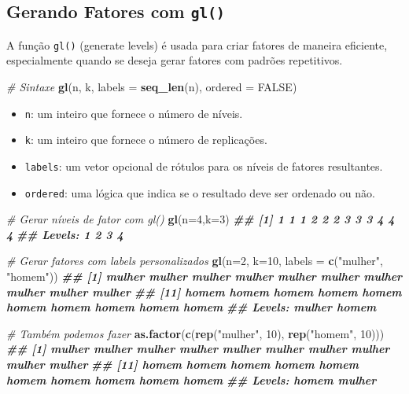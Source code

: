\documentclass[
]{book}
\newenvironment{Shaded}{\begin{snugshade}}{\end{snugshade}}
\newcommand{\AttributeTok}[1]{\textcolor[rgb]{0.13,0.29,0.53}{#1}}
\newcommand{\CommentTok}[1]{\textcolor[rgb]{0.56,0.35,0.01}{\textit{#1}}}
\newcommand{\ConstantTok}[1]{\textcolor[rgb]{0.56,0.35,0.01}{#1}}
\newcommand{\DecValTok}[1]{\textcolor[rgb]{0.00,0.00,0.81}{#1}}
\newcommand{\DocumentationTok}[1]{\textcolor[rgb]{0.56,0.35,0.01}{\textbf{\textit{#1}}}}
\newcommand{\FunctionTok}[1]{\textcolor[rgb]{0.13,0.29,0.53}{\textbf{#1}}}
\newcommand{\NormalTok}[1]{#1}
\newcommand{\StringTok}[1]{\textcolor[rgb]{0.31,0.60,0.02}{#1}}
\begin{document}
\subsection{\texorpdfstring{Gerando Fatores com \texttt{gl()}}{Gerando Fatores com gl()}}\label{gerando-fatores-com-gl}

A função \texttt{gl()} (generate levels) é usada para criar fatores de maneira
eficiente, especialmente quando se deseja gerar fatores com padrões
repetitivos.

\begin{Shaded}
\begin{Highlighting}[]
\CommentTok{\# Sintaxe}
\FunctionTok{gl}\NormalTok{(n, k, }\AttributeTok{labels =} \FunctionTok{seq\_len}\NormalTok{(n), }\AttributeTok{ordered =} \ConstantTok{FALSE}\NormalTok{)}
\end{Highlighting}
\end{Shaded}

\begin{itemize}
\item
  \texttt{n}: um inteiro que fornece o número de níveis.
\item
  \texttt{k}: um inteiro que fornece o número de replicações.
\item
  \texttt{labels}: um vetor opcional de rótulos para os níveis de fatores
  resultantes.
\item
  \texttt{ordered}: uma lógica que indica se o resultado deve ser ordenado ou
  não.
\end{itemize}

\begin{Shaded}
\begin{Highlighting}[]
\CommentTok{\# Gerar níveis de fator com gl()}
\FunctionTok{gl}\NormalTok{(}\AttributeTok{n=}\DecValTok{4}\NormalTok{,}\AttributeTok{k=}\DecValTok{3}\NormalTok{)}
\DocumentationTok{\#\#  [1] 1 1 1 2 2 2 3 3 3 4 4 4}
\DocumentationTok{\#\# Levels: 1 2 3 4}

\CommentTok{\# Gerar fatores com labels personalizados}
\FunctionTok{gl}\NormalTok{(}\AttributeTok{n=}\DecValTok{2}\NormalTok{, }\AttributeTok{k=}\DecValTok{10}\NormalTok{, }\AttributeTok{labels =} \FunctionTok{c}\NormalTok{(}\StringTok{"mulher"}\NormalTok{, }\StringTok{"homem"}\NormalTok{))}
\DocumentationTok{\#\#  [1] mulher mulher mulher mulher mulher mulher mulher mulher mulher mulher}
\DocumentationTok{\#\# [11] homem  homem  homem  homem  homem  homem  homem  homem  homem  homem }
\DocumentationTok{\#\# Levels: mulher homem}

\CommentTok{\# Também podemos fazer}
\FunctionTok{as.factor}\NormalTok{(}\FunctionTok{c}\NormalTok{(}\FunctionTok{rep}\NormalTok{(}\StringTok{"mulher"}\NormalTok{, }\DecValTok{10}\NormalTok{), }\FunctionTok{rep}\NormalTok{(}\StringTok{"homem"}\NormalTok{, }\DecValTok{10}\NormalTok{)))}
\DocumentationTok{\#\#  [1] mulher mulher mulher mulher mulher mulher mulher mulher mulher mulher}
\DocumentationTok{\#\# [11] homem  homem  homem  homem  homem  homem  homem  homem  homem  homem }
\DocumentationTok{\#\# Levels: homem mulher}
\end{Highlighting}
\end{Shaded}
\end{document}
